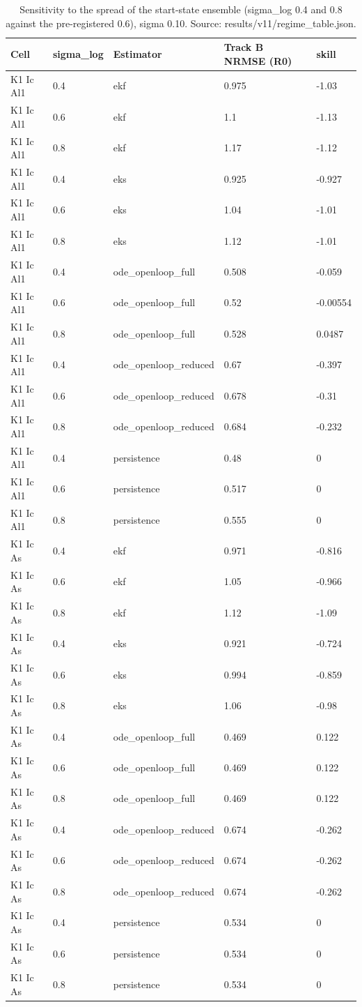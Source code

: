 \begin{table}[t]
\centering
\caption{Sensitivity to the spread of the start-state ensemble (sigma\_log 0.4 and 0.8 against the pre-registered 0.6), sigma 0.10. Source: results/v11/regime\_table.json.}
\label{tab:si-sigmalog}
\footnotesize
\begin{tabular}{lllll}
\toprule
Cell & sigma\_log & Estimator & Track B NRMSE (R0) & skill \\
\midrule
K1 Ic Al1 & 0.4 & ekf & 0.975 & -1.03 \\
K1 Ic Al1 & 0.6 & ekf & 1.1 & -1.13 \\
K1 Ic Al1 & 0.8 & ekf & 1.17 & -1.12 \\
K1 Ic Al1 & 0.4 & eks & 0.925 & -0.927 \\
K1 Ic Al1 & 0.6 & eks & 1.04 & -1.01 \\
K1 Ic Al1 & 0.8 & eks & 1.12 & -1.01 \\
K1 Ic Al1 & 0.4 & ode\_openloop\_full & 0.508 & -0.059 \\
K1 Ic Al1 & 0.6 & ode\_openloop\_full & 0.52 & -0.00554 \\
K1 Ic Al1 & 0.8 & ode\_openloop\_full & 0.528 & 0.0487 \\
K1 Ic Al1 & 0.4 & ode\_openloop\_reduced & 0.67 & -0.397 \\
K1 Ic Al1 & 0.6 & ode\_openloop\_reduced & 0.678 & -0.31 \\
K1 Ic Al1 & 0.8 & ode\_openloop\_reduced & 0.684 & -0.232 \\
K1 Ic Al1 & 0.4 & persistence & 0.48 & 0 \\
K1 Ic Al1 & 0.6 & persistence & 0.517 & 0 \\
K1 Ic Al1 & 0.8 & persistence & 0.555 & 0 \\
K1 Ic As & 0.4 & ekf & 0.971 & -0.816 \\
K1 Ic As & 0.6 & ekf & 1.05 & -0.966 \\
K1 Ic As & 0.8 & ekf & 1.12 & -1.09 \\
K1 Ic As & 0.4 & eks & 0.921 & -0.724 \\
K1 Ic As & 0.6 & eks & 0.994 & -0.859 \\
K1 Ic As & 0.8 & eks & 1.06 & -0.98 \\
K1 Ic As & 0.4 & ode\_openloop\_full & 0.469 & 0.122 \\
K1 Ic As & 0.6 & ode\_openloop\_full & 0.469 & 0.122 \\
K1 Ic As & 0.8 & ode\_openloop\_full & 0.469 & 0.122 \\
K1 Ic As & 0.4 & ode\_openloop\_reduced & 0.674 & -0.262 \\
K1 Ic As & 0.6 & ode\_openloop\_reduced & 0.674 & -0.262 \\
K1 Ic As & 0.8 & ode\_openloop\_reduced & 0.674 & -0.262 \\
K1 Ic As & 0.4 & persistence & 0.534 & 0 \\
K1 Ic As & 0.6 & persistence & 0.534 & 0 \\
K1 Ic As & 0.8 & persistence & 0.534 & 0 \\
\bottomrule
\end{tabular}
\end{table}
